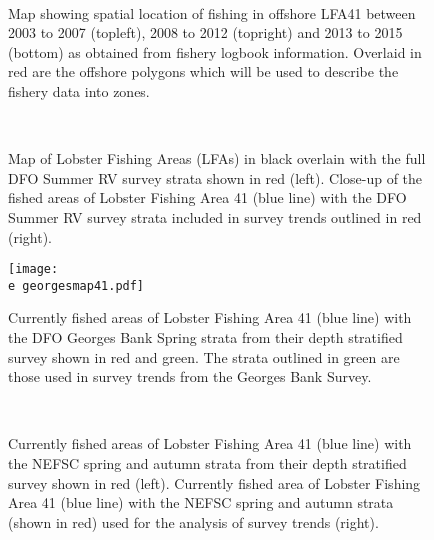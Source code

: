 \documentclass[11pt]{article}
\newcommand{\D}{.}
\newcommand{\e}{/backup/bio_data/bio.lobster/figures/} %
\begin{document}
\begin{landscape}
\begin{figure}
\centering
{}
\\
\caption{Map showing spatial location of fishing in offshore LFA41 between 2003 to 2007 (topleft), 2008 to 2012 (topright) and 2013 to 2015 (bottom) as obtained from fishery logbook information. Overlaid in red are the offshore polygons which will be used to describe the fishery data into zones. }
\end{figure}
\clearpage

\begin{figure}
\centering
{}
\\
\caption{ Map of Lobster Fishing Areas (LFAs) in black overlain with the full DFO Summer RV survey strata shown in red (left). Close-up of the fished areas of Lobster Fishing Area 41 (blue line) with the DFO Summer RV survey strata included in survey trends outlined in red (right).}
\end{figure}

\end{landscape}
\begin{figure}

    \texttt{[image: \\e georgesmap41.pdf]}
    \caption{Currently fished areas of Lobster Fishing Area 41 (blue line) with the DFO Georges Bank Spring strata from their depth stratified survey shown in red and green. The strata outlined in green are those used in survey trends from the Georges Bank Survey.}

\end{figure}

\begin{landscape}
\begin{figure}
\centering
{}
\\
\caption{ Currently fished areas of Lobster Fishing Area 41 (blue line) with the NEFSC spring and autumn strata from their depth stratified survey shown in red (left). Currently fished area of Lobster Fishing Area 41 (blue line) with the NEFSC spring and autumn strata (shown in red) used for the analysis of survey trends (right).}
\end{figure}


\end{landscape}
\end{document}
